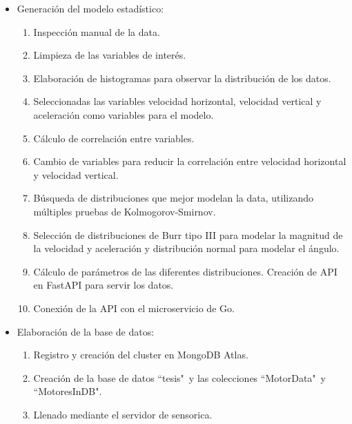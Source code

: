 \begin{itemize}
        \item Generación del modelo estadístico:
    \begin{enumerate}
        \item Inspección manual de la data.
        \item Limpieza de las variables de interés.
        \item Elaboración de histogramas para observar la distribución de los datos.
        \item Seleccionadas las variables velocidad horizontal, velocidad
            vertical y aceleración como variables para el modelo.
        \item Cálculo de correlación entre variables.
        \item Cambio de variables para reducir la correlación entre velocidad
            horizontal y velocidad vertical.
        \item Búsqueda de distribuciones que mejor modelan la data, utilizando
            múltiples pruebas de Kolmogorov-Smirnov.
        \item Selección de distribuciones de Burr tipo III para modelar la
            magnitud de la velocidad y aceleración y distribución normal para
            modelar el ángulo.
        \item Cálculo de parámetros de las diferentes distribuciones. Creación
            de API en FastAPI para servir los datos.
        \item Conexión de la API con el microservicio de Go.
    \end{enumerate}

    \item Elaboración de la base de datos:
        \begin{enumerate}
            \item Registro y creación del cluster en MongoDB Atlas.
            \item Creación de la base de datos ``tesis"\  y las colecciones
                ``MotorData"\  y ``MotoresInDB".
            \item Llenado mediante el servidor de sensorica.
        \end{enumerate}


\end{itemize}
